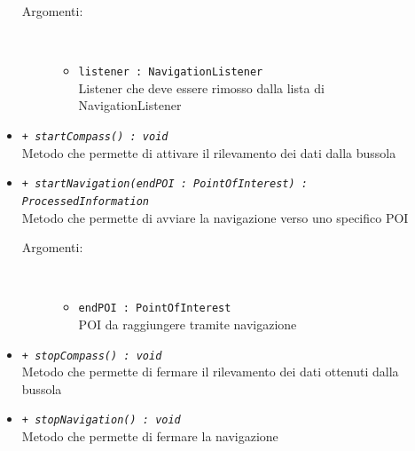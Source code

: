 \documentclass[../DefinizioneDiProdotto.tex]{subfiles}
\begin{document}
\begin{description}
\begin{itemize}
\begin{description}
			\item[Argomenti:] \
			\begin{itemize}
				\item \texttt{listener : NavigationListener}\\
				Listener che deve essere rimosso dalla lista di NavigationListener\end{itemize}
		\end{description}
		\item \texttt{+ \textit{startCompass() : void}}\\
		Metodo che permette di attivare il rilevamento dei dati dalla bussola
		\item \texttt{+ \textit{startNavigation(endPOI : PointOfInterest) : ProcessedInformation}}\\
		Metodo che permette di avviare la navigazione verso uno specifico POI
		\begin{description}
			\item[Argomenti:] \
			\begin{itemize}
				\item \texttt{endPOI : PointOfInterest}\\
				POI da raggiungere tramite navigazione\end{itemize}
		\end{description}
		\item \texttt{+ \textit{stopCompass() : void}}\\
		Metodo che permette di fermare il rilevamento dei dati ottenuti dalla bussola
		\item \texttt{+ \textit{stopNavigation() : void}}\\
		Metodo che permette di fermare la navigazione
	\end{itemize}
\end{description}
\end{document}
